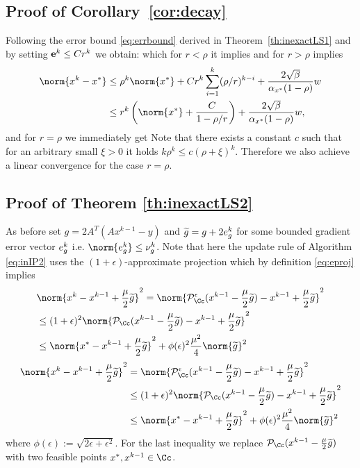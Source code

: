 \subsection{Proof of Corollary~\ref{cor:decay}}
Following the error bound \eqref{eq:errbound} derived in   Theorem~\ref{th:inexactLS1} and by setting $\mathbf{e}^k\leq C r^k$ we obtain:
which for $r<\rho$ it implies 		
and for $r>\rho$ implies %
\begin{align*}
\norm{x^{k}-x^\gt}&\leq  \rho^k \norm{x^\gt}+C r^k \sum_{i=1}^k (\rho/r)^{k-i}  + \frac{2\sqrt{\MM}}{\mmx(1-\rho)}w\\
&\leq r^k \left(\norm{x^\gt}+\frac{C}{1-\rho/r}\right)+ \frac{2\sqrt{\MM}}{\mmx(1-\rho)}w,	
\end{align*}
and for $r=\rho$ we immediately get
Note that there exists a constant $c$ such that for an arbitrary small $\xi>0$ it holds $k\rho^k\leq c(\rho+\xi)^k$. Therefore we also achieve a linear convergence for the case $r=\rho$.
\subsection{Proof of Theorem \ref{th:inexactLS2}}
As before set $g= 2A^T(Ax^{k-1}-y)$ and $\widetilde g= g+2e_g^k$ for some bounded gradient error vector $e_g^k$ i.e. $\norm{\eg^k}\leq \nug^k$. Note that 
here the update rule of Algorithm \eqref{eq:inIP2} uses the  $(1+\epsilon)$-approximate projection  which by definition \eqref{eq:eproj} implies
\ifCLASSOPTIONtwocolumn
\begin{align*}
&\norm{x^k-x^{k-1}+\frac{\mu}{2} \g }^2 =  \norm{\pp^{\epsilon}_{\Cc}(x^{k-1}-\frac{\mu}{2} \g)-x^{k-1}+\frac{\mu}{2} \g }^2\\
&\leq  (1+\epsilon)^2\norm{\pp_{\Cc}(x^{k-1}-\frac{\mu}{2} \g)-x^{k-1}+\frac{\mu}{2} \g }^2\\
&\leq \norm{x^\gt-x^{k-1}+\frac{\mu}{2} \g }^2 + \phi(\epsilon)^2\frac{\mu^2}{4}\norm{\g}^2
\end{align*}
\else
\begin{align*}
\norm{x^k-x^{k-1}+\frac{\mu}{2} \g }^2 &=  \norm{\pp^{\epsilon}_{\Cc}(x^{k-1}-\frac{\mu}{2} \g)-x^{k-1}+\frac{\mu}{2} \g }^2\\
&\leq  (1+\epsilon)^2\norm{\pp_{\Cc}(x^{k-1}-\frac{\mu}{2} \g)-x^{k-1}+\frac{\mu}{2} \g }^2\\
&\leq \norm{x^\gt-x^{k-1}+\frac{\mu}{2} \g }^2 + \phi(\epsilon)^2\frac{\mu^2}{4}\norm{\g}^2
\end{align*}
\fi
where $\phi(\epsilon):=\sqrt{2\epsilon+\epsilon^2}$. For the last inequality we replace $\pp_{\Cc}(x^{k-1}-\frac{\mu}{2} \g)$ with two feasible points $x^\gt,x^{k-1}\in \Cc$. 

